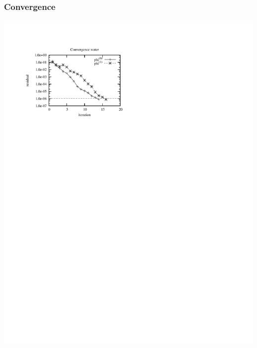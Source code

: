 \begin{frame}
    \frametitle{Convergence}
    \begin{center}
	\includegraphics[scale=1.0, clip, viewport = 50 550 300 730]{figures/response_convergence.pdf}
    \end{center}
\end{frame}
